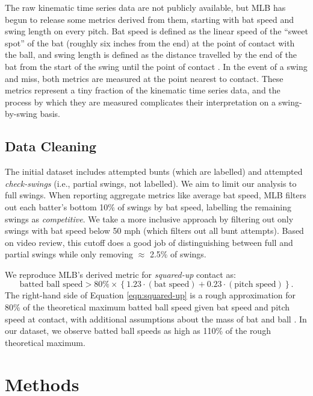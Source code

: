 \documentclass{article}
\begin{document}
      The raw kinematic time series data are not publicly available, but MLB has begun to release some metrics derived from them, starting with bat speed and swing length on every pitch. Bat speed is defined as the linear speed of the ``sweet spot'' of the bat (roughly six inches from the end) at the point of contact with the ball, and swing length is defined as the distance travelled by the end of the bat from the start of the swing until the point of contact \citep{petriello_everything_2024}. In the event of a swing and miss, both metrics are measured at the point nearest to contact. These metrics represent a tiny fraction of the kinematic time series data, and the process by which they are measured complicates their interpretation on a swing-by-swing basis.

    \subsection{Data Cleaning}

    The initial dataset includes attempted bunts (which are labelled) and attempted {\it check-swings} (i.e., partial swings, not labelled). We aim to limit our analysis to full swings. When reporting aggregate metrics like average bat speed, MLB filters out each batter's bottom 10\% of swings by bat speed, labelling the remaining swings as {\it competitive}. We take a more inclusive approach by filtering out only swings with bat speed below 50 mph (which filters out all bunt attempts). Based on video review, this cutoff does a good job of distinguishing between full and partial swings while only removing $\approx$ 2.5\% of swings.

    We reproduce MLB's derived metric for {\it squared-up} contact as:
    \begin{equation}
        \label{eqn:squared-up}
    \mbox{batted ball speed} > 80\% \times \left\{1.23 \cdot (\mbox{bat speed}) + 0.23 \cdot (\mbox{pitch speed})\right\}.
    \end{equation}
    The right-hand side of Equation \ref{eqn:squared-up} is a rough approximation for 80\% of the theoretical maximum batted ball speed given bat speed and pitch speed at contact, with additional assumptions about the mass of bat and ball \citep{nathan_dynamics_2000}. In our dataset, we observe batted ball speeds as high as 110\% of the rough theoretical maximum.

  \section{Methods}
  \label{sec:methods}
\end{document}
